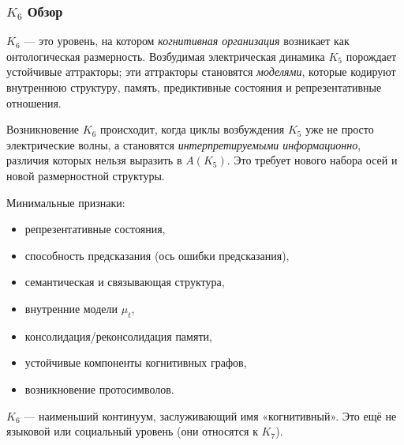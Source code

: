 

\subsubsection{\texorpdfstring{$K_6$}{K_6} Обзор}
\label{sec:k6-overview}

$K_6$ — это уровень, на котором \emph{когнитивная организация} возникает
как онтологическая размерность. Возбудимая электрическая динамика $K_5$
порождает устойчивые аттракторы; эти аттракторы становятся
\emph{моделями}, которые кодируют внутреннюю структуру, память,
предиктивные состояния и репрезентативные отношения.

Возникновение $K_6$ происходит, когда циклы возбуждения $K_5$ уже не
просто электрические волны, а становятся \emph{интерпретируемыми
информационно}, различия которых нельзя выразить в $A(K_5)$. Это
требует нового набора осей и новой размерностной структуры.

Минимальные признаки:
\begin{itemize}
    \item репрезентативные состояния,
    \item способность предсказания (ось ошибки предсказания),
    \item семантическая и связывающая структура,
    \item внутренние модели $\mu_t$,
    \item консолидация/реконсолидация памяти,
    \item устойчивые компоненты когнитивных графов,
    \item возникновение протосимволов.
\end{itemize}

$K_6$ — наименьший континуум, заслуживающий имя «когнитивный». Это ещё
не языковой или социальный уровень (они относятся к $K_7$).

